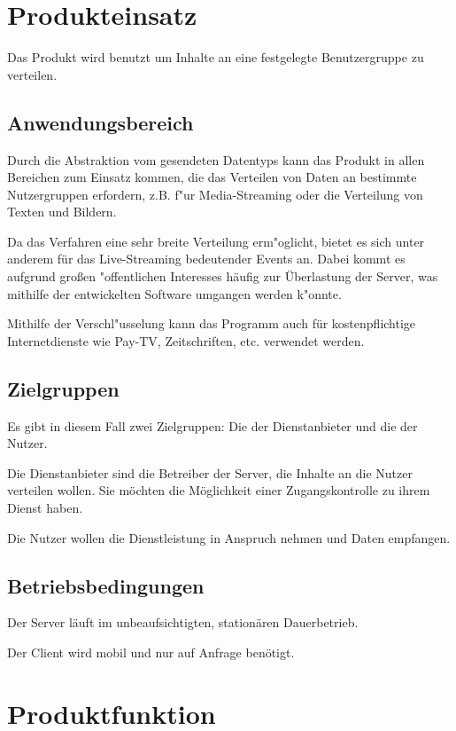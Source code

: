 \documentclass[a4paper,10pt]{scrartcl}
\begin{document}
\section{Produkteinsatz}

Das Produkt wird benutzt um Inhalte an eine festgelegte Benutzergruppe zu verteilen. 

\subsection{Anwendungsbereich}

Durch die Abstraktion vom gesendeten Datentyps kann das Produkt in allen Bereichen zum Einsatz kommen,
die das Verteilen von Daten an bestimmte Nutzergruppen erfordern, z.B. f"ur Media-Streaming oder
die Verteilung von Texten und Bildern.

Da das Verfahren eine sehr breite Verteilung erm"oglicht, bietet es sich unter anderem für das
Live-Streaming bedeutender Events an. Dabei kommt es aufgrund großen "offentlichen Interesses
häufig zur Überlastung der Server, was mithilfe der entwickelten Software umgangen werden k"onnte.

Mithilfe der Verschl"usselung kann das Programm auch für kostenpflichtige Internetdienste
wie Pay-TV, Zeitschriften, etc. verwendet werden.

\subsection{Zielgruppen}

Es gibt in diesem Fall zwei Zielgruppen: Die der Dienstanbieter und die der Nutzer.

Die Dienstanbieter sind die Betreiber der Server, die Inhalte an die Nutzer verteilen wollen. Sie
möchten die Möglichkeit einer Zugangskontrolle zu ihrem Dienst haben.

Die Nutzer wollen die Dienstleistung in Anspruch nehmen und Daten empfangen.

\subsection{Betriebsbedingungen}

Der Server läuft im unbeaufsichtigten, stationären Dauerbetrieb.

Der Client wird mobil und nur auf Anfrage benötigt.

\section{Produktfunktion}
\end{document}

